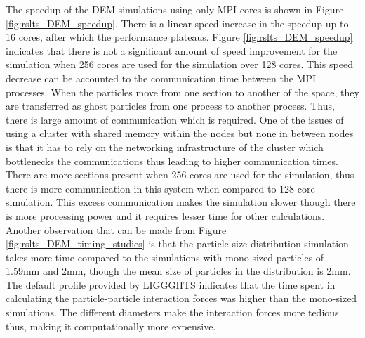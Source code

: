 \documentclass[preprint,11pt,authoryear]{elsarticle}
\begin{document}
The speedup of the DEM simulations using only MPI cores is shown in Figure \ref{fig:rslts_DEM_speedup}.
There is a linear speed increase in the speedup up to 16 cores, after which the 
performance plateaus.
Figure \ref{fig:rslts_DEM_speedup} indicates that there 
is not a significant amount of speed improvement for the simulation when 256 cores are used for the 
simulation over 128 cores. This speed decrease can be accounted to the communication time between 
the MPI processes. When the particles move from one section to another of the space, they are 
transferred as ghost particles from one process to another process. Thus, there is large amount of 
communication which is required. One of the issues of using a cluster with shared memory within 
the nodes but none in between nodes is that it has to rely on the networking infrastructure 
of the cluster which bottlenecks the communications thus leading to higher communication times. 
There are more sections present when 256 cores are used for the simulation, thus there is more 
communication in this system when compared to 128 core simulation. 
This excess communication makes the simulation slower though there is more processing power and 
it requires lesser time for other calculations. Another observation that can be made from Figure 
\ref{fig:rslts_DEM_timing_studies} is that the particle size distribution simulation takes more time 
compared to the simulations with mono-sized particles of 1.59mm and 2mm, though the mean size of 
particles in the distribution is 2mm. The default profile provided by LIGGGHTS indicates that the time 
spent in calculating the particle-particle interaction forces was higher than the mono-sized 
simulations. The different diameters make the interaction forces more tedious thus, making it 
computationally more expensive. 
\end{document}
